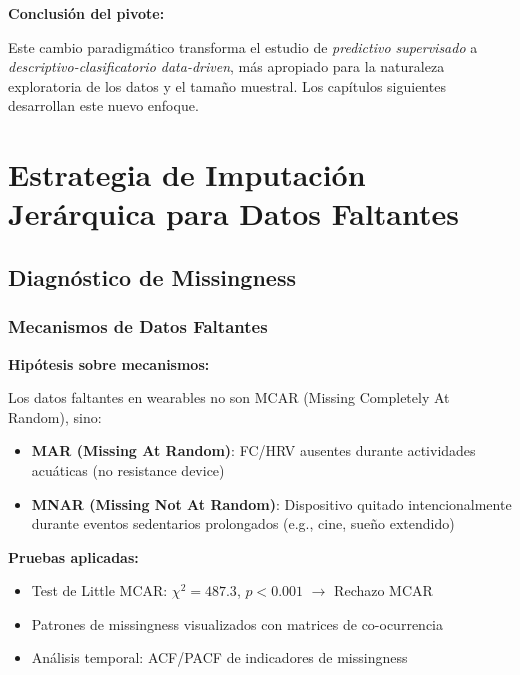 \documentclass[12pt,letterpaper,twoside]{report}
\begin{document}
\begin{conclusionbox}
\textbf{Conclusión del pivote:}

Este cambio paradigmático transforma el estudio de \textit{predictivo supervisado} a \textit{descriptivo-clasificatorio data-driven}, más apropiado para la naturaleza exploratoria de los datos y el tamaño muestral. Los capítulos siguientes desarrollan este nuevo enfoque.
\end{conclusionbox}

\chapter{Estrategia de Imputación Jerárquica para Datos Faltantes}

\section{Diagnóstico de Missingness}

\subsection{Mecanismos de Datos Faltantes}

\begin{hipotesisbox}
\textbf{Hipótesis sobre mecanismos:}

Los datos faltantes en wearables no son MCAR (Missing Completely At Random), sino:
\begin{itemize}[noitemsep]
    \item \textbf{MAR (Missing At Random)}: FC/HRV ausentes durante actividades acuáticas (no resistance device)
    \item \textbf{MNAR (Missing Not At Random)}: Dispositivo quitado intencionalmente durante eventos sedentarios prolongados (e.g., cine, sueño extendido)
\end{itemize}
\end{hipotesisbox}

\begin{estadisticobox}
\textbf{Pruebas aplicadas:}

\begin{itemize}[noitemsep]
    \item Test de Little MCAR: $\chi^2 = 487.3$, $p < 0.001$ $\to$ Rechazo MCAR
    \item Patrones de missingness visualizados con matrices de co-ocurrencia
    \item Análisis temporal: ACF/PACF de indicadores de missingness
\end{itemize}
\end{estadisticobox}
\end{document}
